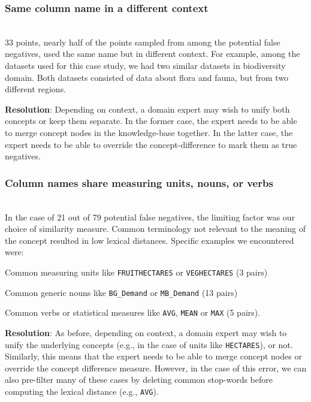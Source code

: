 \smallskip
\subsubsection{Same column name in a different context}~\\
33 points, nearly half of the points sampled from among the potential false negatives, used the same name but in different context.
For example, among the datasets used for this case study, we had two similar datasets in biodiversity domain. 
Both datasets consisted of data about flora and fauna, but from two different regions.

\textbf{Resolution}: Depending on context, a domain expert may wish to unify both concepts or keep them separate.
In the former case, the expert needs to be able to merge concept nodes in the knowledge-base together.  
In the latter case, the expert needs to be able to override the concept-difference to mark them as true negatives.

\smallskip
\subsubsection{Column names share measuring units, nouns, or verbs}~\\
In the case of 21 out of 79 potential false negatives, the limiting factor was our choice of similarity measure.
Common terminology not relevant to the meaning of the concept resulted in low lexical distances.
Specific examples we encountered were:
\begin{enumerate*}
\item Common measuring units like \texttt{FRUITHECTARES} or \texttt{VEGHECTARES} (3 pairs)
\item Common generic nouns like \texttt{BG\_Demand} or \texttt{MB\_Demand} (13 pairs)
\item Common verbs or statistical measures like \texttt{AVG}, \texttt{MEAN} or \texttt{MAX} (5 pairs).
\end{enumerate*}

\textbf{Resolution}:
As before, depending on context, a domain expert may wish to unify the underlying concepts (e.g., in the case of units like \texttt{HECTARES}), or not.
Similarly, this means that the expert needs to be able to merge concept nodes or override the concept difference measure.
However, in the case of this error, we can also pre-filter many of these cases by deleting common stop-words before computing the lexical distance (e.g., \texttt{AVG}).  

